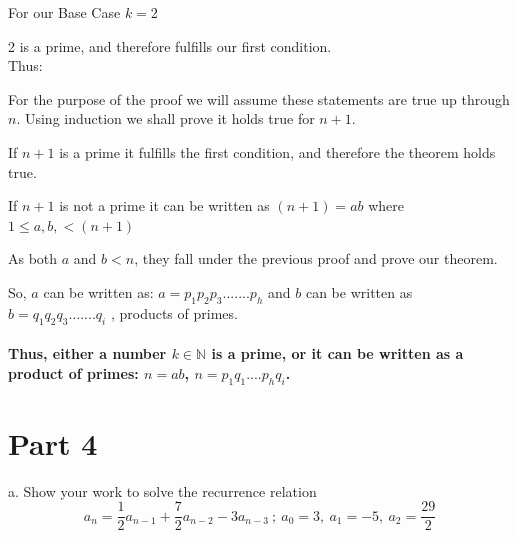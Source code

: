 \documentclass{article}
\begin{document}
For our Base Case $k = 2$

2 is a prime, and therefore fulfills our first condition.\\

Thus:

For the purpose of the proof we will assume these statements are true up through $n$. Using induction we shall prove it holds true for $n+1$.

If $n+1$ is a prime it fulfills the first condition, and therefore the theorem holds true.

If $n+1$ is not a prime it can be written as $(n+1) = ab$ where $1 \leq a, b, < (n+1)$

As both $a$ and $b < n$, they fall under the previous proof and prove our theorem.

So, $a$ can be written as: $a = p_1p_2p_3.......p_h$ and $b$ can be written as $b = q_1q_2q_3.......q_i$ , products of primes.

\paragraph{Thus, either a number $k \in \mathbb{N}$ is a prime, or it can be written as a product of primes: $n = ab$,  $n = p_1q_1....p_hq_i$. }

\newpage
\section{Part 4}

a. Show your work to solve the recurrence relation $$a_n= \frac{1}{2}a_{n-1}+\frac{7}{2}a_{n-2}-3a_{n-3}\ ; \ a_0=3,\ a_1=-5,\ a_2=\frac{29}{2}$$\\
\end{document}
